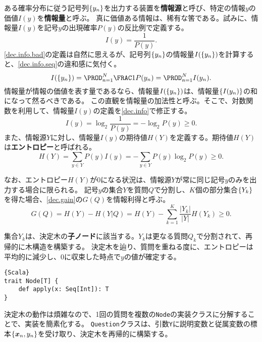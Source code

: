 \documentclass[10pt,a4paper]{book}
\begin{document}
ある確率分布に従う記号列$\seq{y_n}$を出力する装置を\textbf{情報源}と呼び、特定の情報$y$の価値$I(y)$を\textbf{情報量}と呼ぶ。
真に価値ある情報は、稀有な筈である。試みに、情報量$I(y)$を記号$y$の出現確率$P(y)$の反比例で定義する。
%
\begin{equation}
\label{eq:dec.info.bad}
I(y) = \frac{1}{P(y)}.
\end{equation}
%
\eqref{dec.info.bad}の定義は自然に思えるが、記号列$\seq{y_n}$の情報量$I(\seq{y_n})$を計算すると、\eqref{dec.info.seq}の違和感に気付く。
%
\begin{equation}
\label{eq:dec.info.seq}
I(\seq{y_n}) = \prod_{n=1}^N \frac{1}{P(y_n)} = \prod_{n=1}^N I(y_n).
\end{equation}
%
情報量が情報の価値を表す量であるなら、情報量$I(\seq{y_n})$は、情報量$\seq{I(y_n)}$の和になって然るべきである。
この直観を情報量の加法性と呼ぶ。そこで、対数関数を利用して、情報量$I(y)$の定義を\eqref{dec.info}で修正する。
%
\begin{equation}
\label{eq:dec.info}
I(y) = \log_2 \frac{1}{P(y)} = - \log_2 P(y) \geq 0.
\end{equation}
%
また、情報源$Y$に対し、情報量$I(y)$の期待値$H(Y)$を定義する。期待値$H(Y)$は\textbf{エントロピー}と呼ばれる。
%
\begin{equation}
\label{eq:dec.ent}
H(Y) = \sum_{y \in Y} P(y) I(y) = - \sum_{y \in Y} P(y) \log_2 P(y) \geq 0.
\end{equation}

なお、エントロピー$H(Y)$が$0$になる状況は、情報源$Y$が常に同じ記号$y$のみを出力する場合に限られる。
記号$y$の集合$Y$を質問$Q$で分割し、$K$個の部分集合$\seq{Y_k}$を得た場合、\eqref{dec.gain}の$G(Q)$を情報利得と呼ぶ。
%
\begin{equation}
\label{eq:dec.gain}
G(Q) = H(Y) - H(Y|Q) = H(Y) - \sum_{k=1}^K \frac{|Y_k|}{|Y|} H(Y_k) \geq 0.
\end{equation}

集合$Y_k$は、決定木の\textbf{子ノード}に該当する。$Y_k$は更なる質問$Q_k$で分割されて、再帰的に木構造を構築する。
決定木を辿り、質問を重ねる度に、エントロピーは平均的に減少し、$0$に収束した時点で$y$の値が確定する。

\begin{Verbatim}{Scala}
trait Node[T] {
	def apply(x: Seq[Int]): T
}
\end{Verbatim}

決定木の動作は煩雑なので、1回の質問を複数の\texttt{Node}の実装クラスに分解することで、実装を簡素化する。
\texttt{Question}クラスは、引数\texttt{Y}に説明変数と従属変数の標本$\seq{\bm{x}_n,y_n}$を受け取り、決定木を再帰的に構築する。
\end{document}
